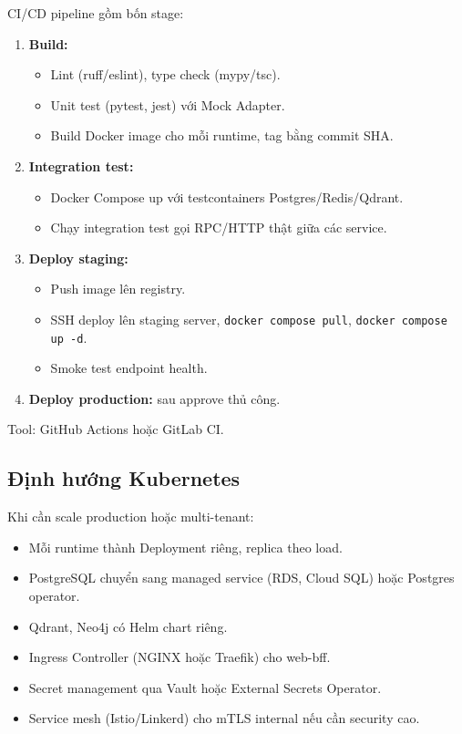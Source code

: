 CI/CD pipeline gồm bốn stage:

\begin{enumerate}
    \item \textbf{Build:}
        \begin{itemize}
            \item Lint (ruff/eslint), type check (mypy/tsc).
            \item Unit test (pytest, jest) với Mock Adapter.
            \item Build Docker image cho mỗi runtime, tag bằng commit SHA.
        \end{itemize}
    \item \textbf{Integration test:}
        \begin{itemize}
            \item Docker Compose up với testcontainers Postgres/Redis/Qdrant.
            \item Chạy integration test gọi RPC/HTTP thật giữa các service.
        \end{itemize}
    \item \textbf{Deploy staging:}
        \begin{itemize}
            \item Push image lên registry.
            \item SSH deploy lên staging server, \texttt{docker compose pull},
                  \texttt{docker compose up -d}.
            \item Smoke test endpoint health.
        \end{itemize}
    \item \textbf{Deploy production:} sau approve thủ công.
\end{enumerate}

Tool: GitHub Actions hoặc GitLab CI.

\subsection{Định hướng Kubernetes}

Khi cần scale production hoặc multi-tenant:

\begin{itemize}
    \item Mỗi runtime thành Deployment riêng, replica theo load.
    \item PostgreSQL chuyển sang managed service (RDS, Cloud SQL) hoặc
          Postgres operator.
    \item Qdrant, Neo4j có Helm chart riêng.
    \item Ingress Controller (NGINX hoặc Traefik) cho web-bff.
    \item Secret management qua Vault hoặc External Secrets Operator.
    \item Service mesh (Istio/Linkerd) cho mTLS internal nếu cần security
          cao.
\end{itemize}

